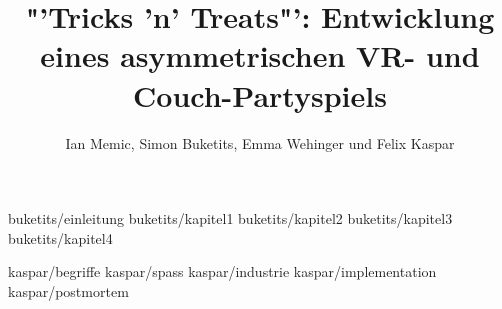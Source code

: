 \documentclass[diplom,german]{hgbthesis}
\begin{document}

%
%
%

%	

\title{"'Tricks 'n' Treats"': Entwicklung eines asymmetrischen VR- und Couch-Partyspiels}
\author{Ian Memic, Simon Buketits, Emma Wehinger und Felix Kaspar}

\frontmatter
\maketitle
\tableofcontents


\mainmatter         %


 {buketits/einleitung}
 {buketits/kapitel1}
 {buketits/kapitel2}
 {buketits/kapitel3}
 {buketits/kapitel4}


 {kaspar/begriffe}
 {kaspar/spass}
 {kaspar/industrie}
 {kaspar/implementation}
 {kaspar/postmortem}
\end{document}
